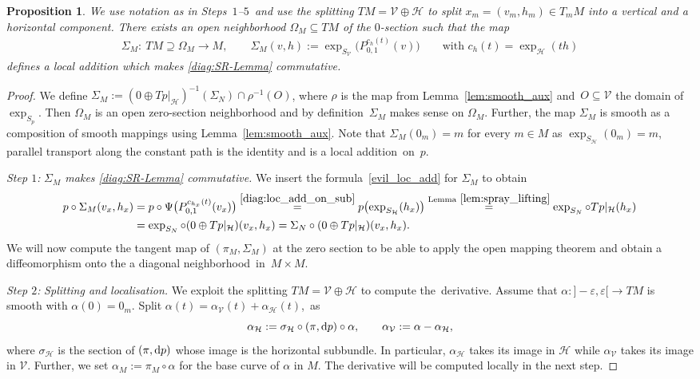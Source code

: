 \documentclass[11pt]{article}
\numberwithin{equation}{section}
\numberwithin{equation}{section}
\newtheorem{Proposition}[Theorem]{Proposition}
\newcommand{\cH}{\ensuremath{\mathcal{H}}}
\newcommand{\cV}{\ensuremath{\mathcal{V}}}
\begin{document}
\begin{Proposition}\label{prop:custom_sigma}
We use notation as in %
Steps~$1$--$5$~and use the splitting $TM=\cV \oplus \cH$ to split $x_m=(v_m,h_m) \in T_m M$ into a vertical and a horizontal component.
There exists an open neighborhood $\Omega_M \subseteq TM$ of the $0$-section such that the map
\begin{align}\label{evil_loc_add}
\Sigma_M\colon \ TM\supseteq \Omega_M \rightarrow M,\qquad \Sigma_{M} (v,h) := \exp_{S_{\cV}}\bigl(P_{0,1}^{c_h(t)}(v)\bigr) \qquad \text{with } c_h(t)=\exp_{\cH}(th)\!\!
\end{align}
defines a local addition which makes \eqref{diag:SR-Lemma} commutative.
\end{Proposition}

\begin{proof}
We define $\Sigma_M := (0 \oplus Tp|_{\cH})^{-1}(\Sigma_N) \cap \rho^{-1} (O)$, where $\rho$ is the map from Lemma~\ref{lem:smooth_aux} and~${O \subseteq \cV}$ the domain of $\exp_{S_p}$. Then $\Omega_M$ is an open zero-section neighborhood and by definition~$\Sigma_M$ makes sense on $\Omega_M$. Further, the map $\Sigma_M$ is smooth as a composition of smooth mappings using Lemma~\ref{lem:smooth_aux}. Note that $\Sigma_M (0_m) = m$ for every $m \in M$ as $\exp_{S_\cH} (0_m)=m$, parallel transport along the constant path is the identity and \smash{$\Psi=\bigl(\pi_{\cV}, \exp_{S_\cV}\bigr)$} is a local addition~on~$p$.

{\it Step $1$:} \emph{$\Sigma_M$ makes \eqref{diag:SR-Lemma} commutative.} We insert the formula~\eqref{evil_loc_add} for $\Sigma_M$ to obtain
\begin{align*}
p\circ \Sigma_M (v_x,h_x)&= p\circ \Psi \bigl(P_{0,1}^{c_{h_x}(t)}(v_x)\bigr) \stackrel{\eqref{diag:loc_add_on_sub}}{=} p \bigl(\exp_{S_\cH} (h_x)\bigr)\stackrel{\text{Lemma}~\ref{lem:spray_lifting}}{=} \exp_{S_N} \circ Tp|_\cH (h_x)\\
& = \exp_{S_N} \circ (0\oplus Tp|_\cH)(v_x,h_x) = \Sigma_N\circ (0\oplus Tp|_\cH)(v_x,h_x).
\end{align*}
We will now compute the tangent map of $(\pi_M,\Sigma_M)$ at the zero section to be able to apply the open mapping theorem and obtain a diffeomorphism onto the a diagonal neighborhood~in~${M\times M}$.

{\it Step $2$:} \emph{Splitting and localisation.}
We exploit the splitting $TM = \cV \oplus \cH$ to compute the~derivative. Assume that $\alpha \colon {}]{-}\varepsilon,\varepsilon[ \rightarrow TM$ is smooth with $\alpha(0)=0_m$. Split $\alpha(t)=\alpha_\cV(t) + \alpha_\cH(t)$,~as
\begin{displaymath}
 \alpha_\cH := \sigma_\cH \circ (\pi,{\rm d}p) \circ \alpha, \qquad \alpha_\cV := \alpha - \alpha_\cH,
\end{displaymath}
where $\sigma_\cH$ is the section of $(\pi,{\rm d}p)$ whose image is the horizontal subbundle. In particular, $\alpha_\cH$ takes its image in $\cH$ while $\alpha_\cV$ takes its image in $\cV$. Further, we set $\alpha_M := \pi_{M} \circ \alpha$ for the base curve of $\alpha$ in $M$. The derivative will be computed locally in the next step.


\end{proof}
\end{document}
